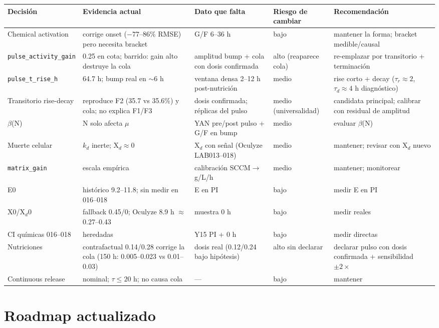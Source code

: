 \documentclass[11pt,a4paper]{article}
\newcommand{\code}[1]{\nolinkurl{#1}}
\begin{document}
{\small
\setlength{\tabcolsep}{3pt}
\begin{longtable}{P{2.3cm}P{3.8cm}P{3.0cm}P{1.7cm}P{3.5cm}}
\toprule
Decisi\'on & Evidencia actual & Dato que falta & Riesgo de cambiar & Recomendaci\'on \\
\midrule
Chemical activation & corrige onset ($-77$--$86\%$ RMSE) pero necesita bracket & G/F 6--36 h & bajo & mantener la forma; bracket medible/causal \\
\code{pulse_activity_gain} & 0.25 en cota; barrido: gain alto destruye la cola & amplitud bump + cola con dosis confirmada & alto (reaparece cola) & re-emplazar por transitorio + terminaci\'on \\
\code{pulse_t_rise_h} & 64.7 h; bump real en ${\sim}$6 h & ventana densa 2--12 h post-nutrici\'on & medio & rise corto + decay ($\tau_r{\approx}2$, $\tau_d{\approx}4$ h diagn\'ostico) \\
Transitorio rise-decay & reproduce F2 (35.7 vs 35.6\%) y cola; no explica F1/F3 & dosis confirmada; r\'eplicas del pulso & medio (universalidad) & candidata principal; calibrar con residual de amplitud \\
$\beta$(N) & N solo afecta $\mu$ & YAN pre/post pulso + G/F en bump & medio & evaluar $\beta$(N) \\
Muerte celular & $k_d$ inerte; X$_d\approx 0$ & X$_d$ con se\~nal (Oculyze LAB013--018) & medio & mantener; revisar con X$_d$ nuevo \\
\code{matrix_gain} & escala emp\'irica & calibraci\'on SCCM$\to$g/L/h & medio & mantener; monitorear \\
E0 & hist\'orico 9.2--11.8; sin medir en 016--018 & E en PI & bajo & medir E en PI \\
X0/X$_d$0 & fallback 0.45/0; Oculyze 8.9 h $\approx$ 0.27--0.43 & muestra 0 h & bajo & medir reales \\
CI qu\'imicas 016--018 & heredadas & Y15 PI + 0 h & bajo & medir directas \\
Nutriciones & contrafactual 0.14/0.28 corrige la cola (150 h: 0.005--0.023 vs 0.01--0.03) & dosis real (0.12/0.24 bajo hip\'otesis) & alto sin declarar & declarar pulso con dosis confirmada + sensibilidad $\pm 2\times$ \\
Continuous release & nominal; $\tau\le 20$ h; no causa cola & --- & bajo & mantener \\
\bottomrule
\end{longtable}
}

\section{Roadmap actualizado}
\end{document}
